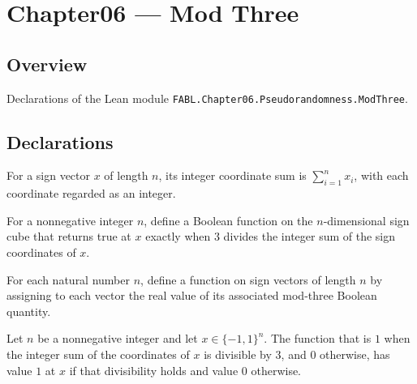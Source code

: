 \chapter{Chapter06 — Mod Three}
\section{Overview}

Declarations of the Lean module \texttt{FABL.Chapter06.Pseudorandomness.ModThree}.

\section{Declarations}

\begin{definition}
\label{FABL.signCoordinateIntegerSum}
\leanok
For a sign vector $x$ of length $n$, its integer coordinate sum is $\sum_{i=1}^n x_i$,
with each coordinate regarded as an integer.
\end{definition}

\begin{definition}
\label{FABL.modThreeBoolean}
\leanok
{}
For a nonnegative integer $n$, define a Boolean function on the $n$-dimensional sign
cube that returns true at $x$ exactly when $3$ divides the integer sum of the sign
coordinates of $x$.
\end{definition}

\begin{definition}
\label{FABL.modThree}
\leanok
{}
For each natural number $n$, define a function on sign vectors of length $n$ by
assigning to each vector the real value of its associated mod-three Boolean quantity.
\end{definition}

\begin{theorem}
\label{FABL.modThree_apply}
\leanok
{}
Let $n$ be a nonnegative integer and let $x\in\{-1,1\}^n$. The function that is $1$
when the integer sum of the coordinates of $x$ is divisible by $3$, and $0$ otherwise,
has value $1$ at $x$ if that divisibility holds and value $0$ otherwise.
\end{theorem}

